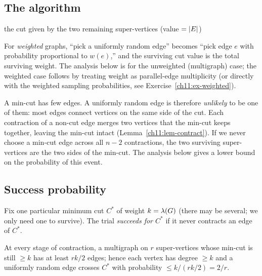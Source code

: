 \subsection{The algorithm}

\begin{algorithm}[H]
\caption{\textsc{KargerContract}$(\Gph)$ --- one trial (unweighted multigraph)}
\label{ch11:alg-karger}
\DontPrintSemicolon
{}
\Return the cut given by the two remaining super-vertices (value $=\lvert E\rvert$)\;
\end{algorithm}

For \emph{weighted} graphs, ``pick a uniformly random edge'' becomes ``pick edge $e$ with probability proportional to $w(e)$,'' and the surviving cut value is the total surviving weight. The analysis below is for the unweighted (multigraph) case; the weighted case follows by treating weight as parallel-edge multiplicity (or directly with the weighted sampling probabilities, see Exercise~\ref{ch11:ex-weighted}).

\begin{intuitionbox}
A min-cut has few edges. A uniformly random edge is therefore \emph{unlikely} to be one of them: most edges connect vertices on the same side of the cut. Each contraction of a non-cut edge merges two vertices that the min-cut keeps together, leaving the min-cut intact (Lemma~\ref{ch11:lem-contract}). If we never choose a min-cut edge across all $n-2$ contractions, the two surviving super-vertices are the two sides of the min-cut. The analysis below gives a lower bound on the probability of this event.
\end{intuitionbox}

\subsection{Success probability}

Fix one particular minimum cut $C^\ast$ of weight $k=\lambda(G)$ (there may be several; we only need one to survive). The trial \emph{succeeds for $C^\ast$} if it never contracts an edge of $C^\ast$.

\begin{lemma}\label{ch11:lem-mindeg}
At every stage of contraction, a multigraph on $r$ super-vertices whose min-cut is still $\ge k$ has at least $rk/2$ edges; hence each vertex has degree $\ge k$ and a uniformly random edge crosses $C^\ast$ with probability $\le k/(rk/2)=2/r$.
\end{lemma}

